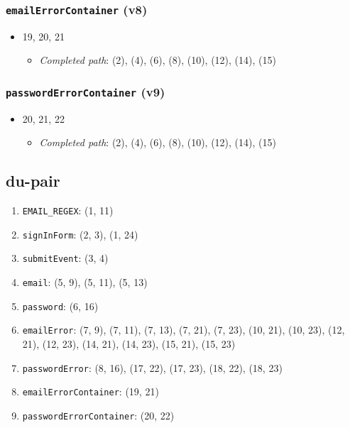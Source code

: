 \documentclass{article}
\newcommand{\completedpath}{\textit{Completed path}}
\begin{document}
\subsubsection*{\texttt{emailErrorContainer} (v8)}

\begin{itemize}
    \item 19, 20, 21
          \begin{itemize}
              \item \completedpath: (2), (4), (6), (8), (10), (12), (14), (15)
          \end{itemize}
\end{itemize}

\subsubsection*{\texttt{passwordErrorContainer} (v9)}

\begin{itemize}
    \item 20, 21, 22
          \begin{itemize}
              \item \completedpath: (2), (4), (6), (8), (10), (12), (14), (15)
          \end{itemize}
\end{itemize}

\subsection{du-pair}

\begin{enumerate}[label = (v\arabic*)]
    \item \texttt{EMAIL\_REGEX}: (1, 11)
    \item \texttt{signInForm}: (2, 3), (1, 24)
    \item \texttt{submitEvent}: (3, 4)
    \item \texttt{email}: (5, 9), (5, 11), (5, 13)
    \item \texttt{password}: (6, 16)
    \item \texttt{emailError}: (7, 9), (7, 11), (7, 13), (7, 21), (7, 23), (10, 21), (10, 23), (12, 21), (12, 23), (14, 21), (14, 23), (15, 21), (15, 23)
    \item \texttt{passwordError}: (8, 16), (17, 22), (17, 23), (18, 22), (18, 23)
    \item \texttt{emailErrorContainer}: (19, 21)
    \item \texttt{passwordErrorContainer}: (20, 22)
\end{enumerate}
\end{document}
